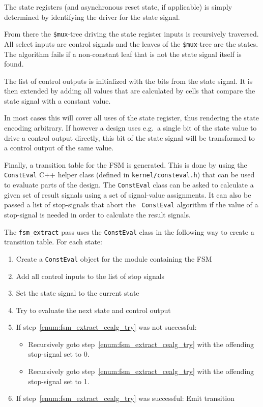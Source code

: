 The state registers (and asynchronous reset state, if applicable) is simply determined
by identifying the driver for the state signal.

From there the {\tt \$mux}-tree driving the state register inputs is
recursively traversed. All select inputs are control signals and the leaves of the
{\tt \$mux}-tree are the states. The algorithm fails if a non-constant leaf 
that is not the state signal itself is found.

The list of control outputs is initialized with the bits from the state signal.
It is then extended by adding all values that are calculated by cells that
compare the state signal with a constant value.

In most cases this will cover all uses of the state register, thus rendering the
state encoding arbitrary. If however a design uses e.g.~a single bit of the state
value to drive a control output directly, this bit of the state signal will be
transformed to a control output of the same value.

Finally, a transition table for the FSM is generated. This is done by using the
{\tt ConstEval} C++ helper class (defined in {\tt kernel/consteval.h}) that can
be used to evaluate parts of the design. The {\tt ConstEval} class can be asked
to calculate a given set of result signals using a set of signal-value
assignments. It can also be passed a list of stop-signals that abort the {\tt
ConstEval} algorithm if the value of a stop-signal is needed in order to
calculate the result signals.

The {\tt fsm\_extract} pass uses the {\tt ConstEval} class in the following way
to create a transition table. For each state:

\begin{enumerate}
\item Create a {\tt ConstEval} object for the module containing the FSM
\item Add all control inputs to the list of stop signals
\item Set the state signal to the current state
\item Try to evaluate the next state and control output \label{enum:fsm_extract_cealg_try}
\item If step~\ref{enum:fsm_extract_cealg_try} was not successful:
\begin{itemize}
\item Recursively goto step~\ref{enum:fsm_extract_cealg_try} with the offending stop-signal set to 0.
\item Recursively goto step~\ref{enum:fsm_extract_cealg_try} with the offending stop-signal set to 1.
\end{itemize}
\item If step~\ref{enum:fsm_extract_cealg_try} was successful: Emit transition
\end{enumerate}

